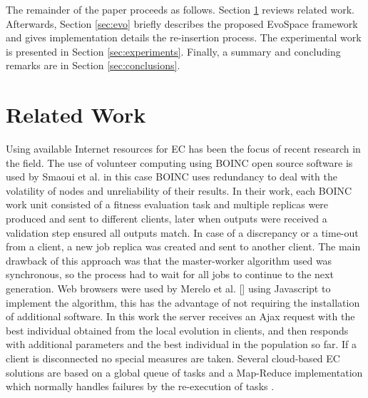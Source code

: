 \documentclass{llncs}
\begin{document}
The remainder of the paper proceeds as follows. Section \ref{sec:work} 
reviews related work. Afterwards, Section \ref{sec:evo} briefly describes the
proposed EvoSpace framework and gives implementation details the re-insertion
process. The experimental work is presented in Section \ref{sec:experiments}.
Finally, a summary and concluding remarks are in Section \ref{sec:conclusions}.

\section{Related Work}
\label{sec:work}
Using available Internet resources for EC has been the focus of recent research
in the field. The use of volunteer computing using BOINC open source software 
is used by Smaoui et al.  \cite{FekiNG09} in this case BOINC uses redundancy
to deal with the volatility of nodes and unreliability of their results. 
In their work, each BOINC work unit consisted of a fitness evaluation task and
multiple replicas were produced and sent to different clients, later when 
outputs were received a validation step ensured all outputs match. In case of
a discrepancy or a time-out from a client, a new job replica was created and
sent to another client. The main drawback of this approach was that the 
master-worker algorithm used was synchronous, so the process had to wait 
for all jobs to continue to the next generation. Web browsers were used by 
Merelo et al. [] using Javascript to implement the algorithm, this has the 
advantage of not requiring the installation of additional software. 
In this work the server receives an Ajax request with the best individual 
obtained from the local evolution in clients, and then responds with 
additional parameters and the best individual in the population so far. 
If a client is disconnected no special measures are taken. Several cloud-based
EC solutions are based on a  global queue of tasks and a Map-Reduce 
implementation which normally handles failures by the re-execution of 
tasks \cite{fazenda2012,di2013towards,FlexGP}. 

\end{document}

